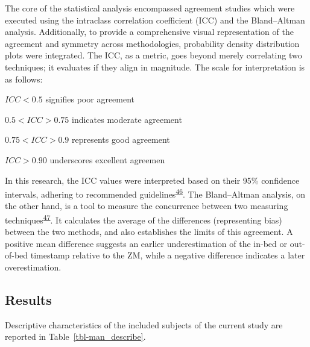 \documentclass[
  9pt,
]{article}
\begin{document}
The core of the statistical analysis encompassed agreement studies which
were executed using the intraclass correlation coefficient (ICC) and the
Bland--Altman analysis. Additionally, to provide a comprehensive visual
representation of the agreement and symmetry across methodologies,
probability density distribution plots were integrated. The ICC, as a
metric, goes beyond merely correlating two techniques; it evaluates if
they align in magnitude. The scale for interpretation is as follows:

\(ICC < 0.5\) signifies poor agreement

\(0.5 < ICC > 0.75\) indicates moderate agreement

\(0.75 < ICC > 0.9\) represents good agreement

\(ICC > 0.90\) underscores excellent agreemen

In this research, the ICC values were interpreted based on their 95\%
confidence intervals, adhering to recommended
guidelines\textsuperscript{\protect\hyperlink{ref-koo_guideline_2016}{46}}.
The Bland--Altman analysis, on the other hand, is a tool to measure the
concurrence between two measuring
techniques\textsuperscript{\protect\hyperlink{ref-bland_measuring_1999}{47}}.
It calculates the average of the differences (representing bias) between
the two methods, and also establishes the limits of this agreement. A
positive mean difference suggests an earlier underestimation of the
in-bed or out-of-bed timestamp relative to the ZM, while a negative
difference indicates a later overestimation.

\hypertarget{results}{%
\subsection{Results}\label{results}}

Descriptive characteristics of the included subjects of the current
study are reported in Table~\ref{tbl-man_describe}.

\begingroup

\footnotesize
\end{document}
